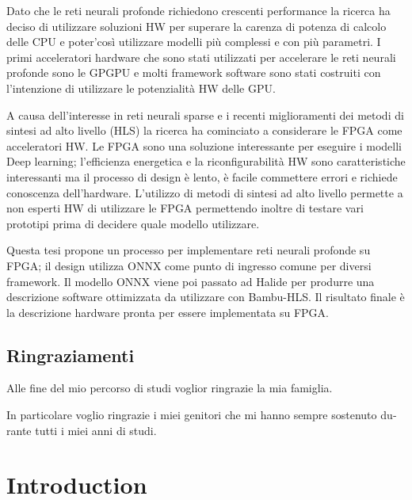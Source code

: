 \documentclass[11pt, a4paper, twoside, openright]{report}
\begin{document}
Dato che le reti neurali profonde richiedono crescenti performance la ricerca ha deciso di utilizzare soluzioni HW per superare la carenza di potenza di calcolo delle CPU e poter'così utilizzare modelli più complessi e con più parametri.
I primi acceleratori hardware che sono stati utilizzati per accelerare le reti neurali profonde sono le GPGPU e molti framework software sono stati costruiti con l'intenzione di utilizzare le potenzialità HW delle GPU.

A causa dell'interesse in reti neurali sparse e i recenti miglioramenti dei metodi di sintesi ad alto livello (HLS) la ricerca ha cominciato a considerare le FPGA come acceleratori HW.
Le FPGA sono una soluzione interessante per eseguire i modelli Deep learning; l'efficienza energetica e la riconfigurabilità HW sono caratteristiche interessanti ma il processo di design è lento, è facile commettere errori e richiede conoscenza dell'hardware.
L'utilizzo di metodi di sintesi ad alto livello permette a non esperti HW di utilizzare le FPGA permettendo inoltre di testare vari prototipi prima di decidere quale modello utilizzare.

Questa tesi propone un processo per implementare reti neurali profonde su FPGA; il design utilizza ONNX come punto di ingresso comune per diversi framework.
Il modello ONNX viene poi passato ad Halide per produrre una descrizione software ottimizzata da utilizzare con Bambu-HLS.
Il risultato finale è la descrizione hardware pronta per essere implementata su FPGA.


\begin{otherlanguage}{italian}

\newpage

\chapter*{Ringraziamenti}

Alle fine del mio percorso di studi voglior ringrazie la mia famiglia.

In particolare voglio ringrazie i miei genitori che mi hanno sempre sostenuto durante tutti i miei anni di studi.

\newpage

\end{otherlanguage}

\setlength{\parskip}{0.5em}
\tableofcontents

\setlength{\parskip}{1em}
\chapter{Introduction}

\end{document}
